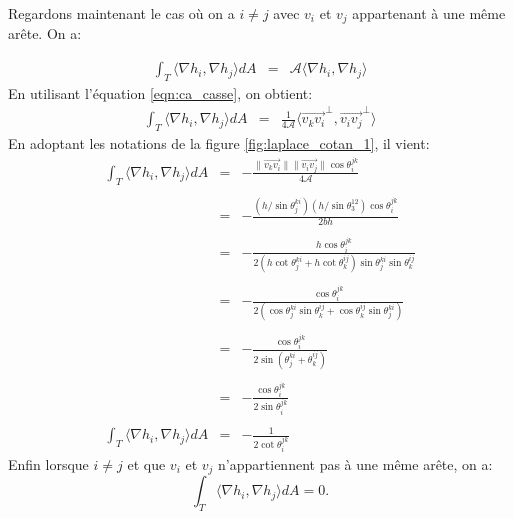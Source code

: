 Regardons maintenant le cas où on a $i\neq j$ avec $v_i$ et $v_j$ appartenant à une même arête. On a:

\[
\begin{array}{lcl}
\displaystyle\int_T \langle \nabla h_i, \nabla h_j \rangle dA &= &\mathcal{A}\langle \nabla h_i, \nabla h_j \rangle
\end{array}
\]
En utilisant l'équation \ref{eqn:ca_casse}, on obtient:
\[
\begin{array}{lcl}
\displaystyle\int_T \langle \nabla h_i, \nabla h_j \rangle dA&=& \displaystyle\frac{1}{4\mathcal{A}} \langle \overrightarrow{v_kv_i}^\perp, \overrightarrow{v_iv_j}^\perp \rangle
\end{array}
\]
En adoptant les notations de la figure \ref{fig:laplace_cotan_1}, il vient:
\[
\begin{array}{lcl}
\displaystyle\int_T \langle \nabla h_i, \nabla h_j \rangle dA&=& -\displaystyle\frac{\|\overrightarrow{v_kv_i}\|\|\overrightarrow{v_iv_j}\| \cos \theta_i^{jk}}{4\mathcal{A}}\\\\
&=& -\displaystyle\frac{(h/\sin \theta_j^{ki})(h/\sin \theta_3^{12}) \cos \theta_i^{jk}}{2bh}\\\\
&=& -\displaystyle\frac{h \cos \theta_i^{jk}}{2(h \cot \theta_j^{ki} + h \cot \theta_k^{ij}) \sin \theta_j^{ki} \sin \theta_k^{ij}}\\\\
&=& -\displaystyle\frac{\cos \theta_i^{jk}}{2(\cos \theta_j^{ki} \sin \theta_k^{ij} + \cos \theta_k^{ij} \sin \theta_j^{ki})}\\\\
&=& -\displaystyle\frac{\cos \theta_i^{jk}}{2 \sin(\theta_j^{ki} + \theta_k^{ij})}\\\\
&=& -\displaystyle\frac{\cos \theta_i^{jk}}{2 \sin \theta_i^{jk}}\\\\
\displaystyle\int_T \langle \nabla h_i, \nabla h_j \rangle dA&=& -\displaystyle\frac{1}{2 \cot \theta_i^{jk}}
\end{array}
\]
Enfin lorsque $i\neq j$ et que $v_i$ et $v_j$ n'appartiennent pas à une même arête, on a:
$$\displaystyle\int_T \langle \nabla h_i, \nabla h_j \rangle dA=0.$$

